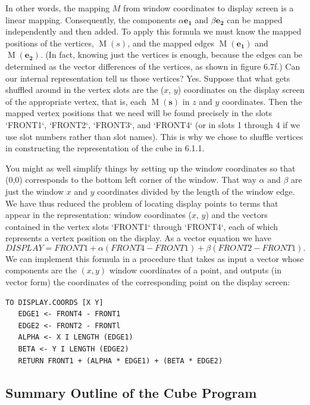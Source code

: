 \documentclass{book}
\begin{document}
In other words, the mapping $M$ from window coordinates to display
screen is a linear mapping. Consequently, the components $\alpha \mathbf{e_1}$ and $\beta \mathbf{e_2}$
can be mapped independently and then added. To apply this formula
we must know the mapped positions of the vertices, $\operatorname{M}(s)$, and the
mapped edges $\operatorname{M}(\mathbf{e_1})$ and $\operatorname{M}(\mathbf{e_2})$. (In fact, knowing just the vertices
is enough, because the edges can be determined as the vector differences
of the vertices, as shown in figure 6.7f.) Can our internal representation
tell us those vertices? Yes. Suppose that what gets shuffled around in
the vertex slots are the ($x$, $y$) coordinates on the display screen of the
appropriate vertex, that is, each $\operatorname{M}(\mathbf{s})$ in $z$ and $y$ coordinates. Then the
mapped vertex positions that we need will be found precisely in the slots
\textsc{`FRONT1`}, \textsc{`FRONT2`}, \textsc{`FRONT3`}, and \textsc{`FRONT4`} (or in slots 1 through 4 if we use
slot numbers rather than slot names). This is why we chose to shuffle
vertices in constructing the representation of the cube in 6.1.1.

You might as well simplify things by setting up the window coordinates
so that (0,0) corresponds to the bottom left corner of the window.
That way $\alpha$ and $\beta$ are just the window $x$ and $y$ coordinates divided
by the length of the window edge. We have thus reduced the problem
of locating display points to terms that appear in the representation:
window coordinates ($x$, $y$) and the vectors contained in the vertex slots
\textsc{`FRONT1`} through \textsc{`FRONT4`}, each of which represents a vertex position on
the display. As a vector equation we have
$$DISPLAY = FRONT1 + \alpha (FRONT4 - FRONT1) + \beta (FRONT2 - FRONT1).$$
 We can implement this formula in a procedure that takes as input a
vector whose components are the $(x, y)$ window coordinates of a point,
and outputs (in vector form) the coordinates of the corresponding point
on the display screen:

\begin{verbatim}
TO DISPLAY.COORDS [X Y]
   EDGE1 <- FRONT4 - FRONT1
   EDGE2 <- FRONT2 - FRONTl
   ALPHA <- X I LENGTH (EDGE1)
   BETA <- Y I LENGTH (EDGE2)
   RETURN FRONT1 + (ALPHA * EDGE1) + (BETA * EDGE2)
\end{verbatim}
\subsection{Summary Outline of the Cube Program}
\end{document}
